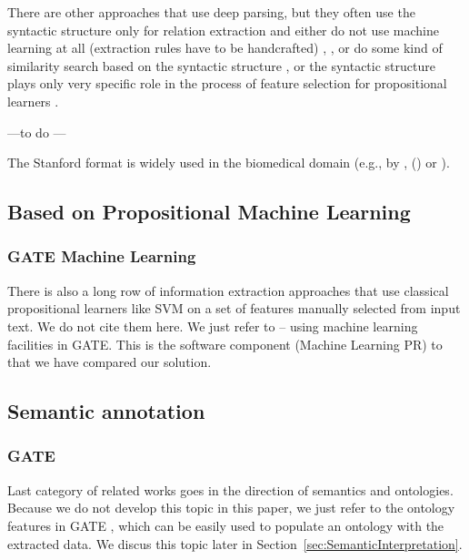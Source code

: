 
There are other approaches that use deep parsing, but they often use the syntactic structure only for relation extraction and either do not use machine learning at all (extraction rules have to be handcrafted) 
\citep{Yakushiji2001},
\citep{RelEx},
\citep{Buyko:dependencyGraphs}
or do some kind of similarity search based on the syntactic structure
\citep{Etzioni08informationExtraction},
\citep{Wang:SimilarityTreeSkeletons}
or the syntactic structure plays only very specific role in the process of feature selection for propositional learners %
\citep{Bunescu:DependencyPaths}.

---to do ---

The
Stanford format is widely used in the biomedical
domain (e.g., by \cite{MiyaoACL2008}, (\cite{Yakushiji2001}) or
\cite{Clegg2005Evaluating}).


\subsection{Based on Propositional Machine Learning}
\subsubsection{GATE Machine Learning}
There is also a long row of information extraction approaches that use classical propositional learners like SVM on a set of features manually selected from input text. We do not cite them here. We just refer to \citep{Yaoyong09a} -- using machine learning facilities in GATE. This is the software component (Machine Learning PR) to that we have compared our solution. 

\subsection{Semantic annotation}
\subsubsection{GATE}
Last category of related works goes in the direction of semantics and ontologies. Because we do not develop this topic in this paper, we just refer to the ontology features in GATE \citep{Bon04b}, which can be easily used to populate an ontology with the extracted data. We discus this topic later in Section~\ref{sec:SemanticInterpretation}.




